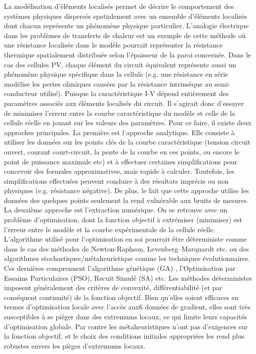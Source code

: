 La modélisation d'éléments localisés permet de décrire le comportement des systèmes physiques dispersés spatialement avec un ensemble d'éléments localisés dont chacun représente un phénomène physique particulier. L'analogie électrique dans les problèmes de transferts de chaleur est un exemple de cette méthode où une résistance localisée dans le modèle pourrait représenter la résistance thermique spatialement distribuée selon l'épaisseur de la paroi concernée. Dans le cas des cellules PV, chaque élément du circuit équivalent représente aussi un phénomène physique spécifique dans la cellule (e.g. une résistance en série modélise les pertes ohmiques causées par la résistance intrinsèque au semi-conducteur utilisé). Puisque la caractéristique I-V dépend entièrement des paramètres associés aux éléments localisés du circuit. Il s'agirait donc d'essayer de minimiser l'erreur entre la courbe caractéristique du modèle et celle de la cellule réelle en jouant sur les valeurs des paramètres. 
Pour ce faire, il existe deux approches principales. La première est l'approche analytique. Elle consiste à utiliser les données sur les points clés de la courbe caractéristique (tension circuit ouvert, courant court-circuit, la pente de la courbe en ces points, ou encore le point de puissance maximale etc) et à effectuer certaines simplifications pour concevoir des formules approximatives, mais rapide à calculer. Toutefois, les simplifications effectuées peuvent conduire à des résultats imprécis ou non physiques (e.g. résistance négative). De plus, le fait que cette approche utilise les données des quelques points seulement la rend vulnérable aux bruits de mesures. La deuxième approche est l'extraction numérique. On se retrouve avec un problème d'optimisation, dont la fonction objectif à extrémiser (minimiser) est l'erreur entre le modèle et la courbe expérimentale de la cellule réelle. L'algorithme utilisé pour l'optimisation en soi pourrait être déterministe comme dans le cas des méthodes de Newton-Raphson, Levenberg–Marquardt etc. ou des algorithmes stochastiques/métaheuristique comme les techniques évolutionnaires. Ces dernières comprennent l'algorithme génétique (GA) , l'Optimisation par Essaims Particulaires (PSO), Recuit Simulé (SA)  etc. Les méthodes déterministes imposent généralement des critères de convexité, différentiabilité (et par conséquent continuité) de la fonction objectif. Bien qu'elles soient efficaces en termes d'optimisation locale avec l'accès aux6 données de gradient, elles sont très susceptibles à se piéger dans des extremums locaux, ce qui limite leurs capacités d'optimisation globale. Par contre les métaheuristiques n'ont pas d'exigences sur la fonction objectif, et le choix des conditions initiales appropriées les rend plus robustes envers les pièges d'extremums locaux.

